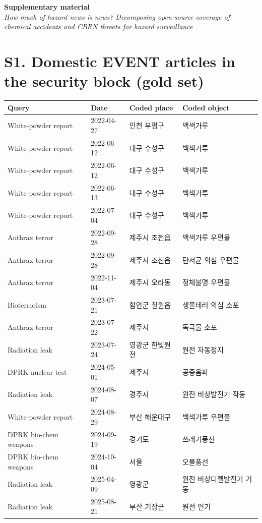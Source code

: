 \documentclass[11pt]{article}
\begin{document}
\begin{center}{\large\bfseries Supplementary material}\\[4pt]{\itshape How much of hazard news is news? Decomposing open-source coverage of chemical accidents and CBRN threats for hazard surveillance}\end{center}
\section*{S1. Domestic EVENT articles in the security block (gold set)}
{\small\setlength{\tabcolsep}{4pt}
\begin{tabular}{llll}\toprule Query & Date & Coded place & Coded object \\\midrule
White-powder report & 2022-04-27 & 인천 부평구 & 백색가루 \\
White-powder report & 2022-06-12 & 대구 수성구 & 백색가루 \\
White-powder report & 2022-06-12 & 대구 수성구 & 백색가루 \\
White-powder report & 2022-06-13 & 대구 수성구 & 백색가루 \\
White-powder report & 2022-07-04 & 대구 수성구 & 백색가루 \\
Anthrax terror & 2022-09-28 & 제주시 조천읍 & 백색가루 우편물 \\
Anthrax terror & 2022-09-28 & 제주시 조천읍 & 탄저균 의심 우편물 \\
Anthrax terror & 2022-11-04 & 제주시 오라동 & 정체불명 우편물 \\
Bioterrorism & 2023-07-21 & 함안군 칠원읍 & 생물테러 의심 소포 \\
Anthrax terror & 2023-07-22 & 제주시 & 독극물 소포 \\
Radiation leak & 2023-07-24 & 영광군 한빛원전 & 원전 자동정지 \\
DPRK nuclear test & 2024-05-01 & 제주시 & 공중음파 \\
Radiation leak & 2024-08-07 & 경주시 & 원전 비상발전기 작동 \\
White-powder report & 2024-08-29 & 부산 해운대구 & 백색가루 우편물 \\
DPRK bio-chem weapons & 2024-09-19 & 경기도 & 쓰레기풍선 \\
DPRK bio-chem weapons & 2024-10-04 & 서울 & 오물풍선 \\
Radiation leak & 2025-04-09 & 영광군 & 원전 비상디젤발전기 기동 \\
Radiation leak & 2025-08-21 & 부산 기장군 & 원전 연기 \\
\bottomrule\end{tabular}}
\end{document}
